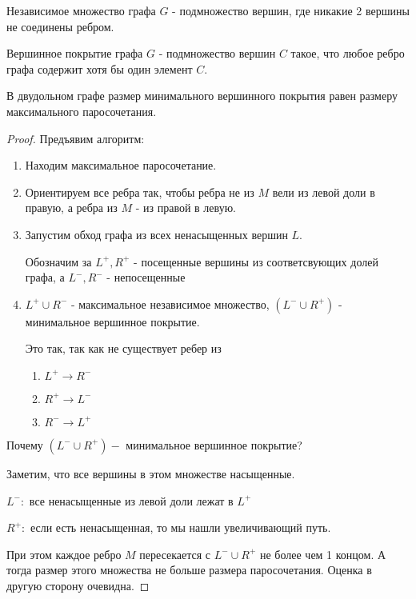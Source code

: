 \begin{definition}
  Независимое множество графа $G$ - подмножество вершин, где никакие 2 вершины не соединены ребром. 
\end{definition}

\begin{definition}
  Вершинное покрытие графа $G$ - подмножество вершин $C$ такое, что любое ребро графа содержит хотя бы один элемент $C$. 
\end{definition}

\begin{theorem}[Кёниг]
  В двудольном графе размер минимального вершинного покрытия равен размеру максимального паросочетания. 
\end{theorem}

\begin{proof}
  Предъявим алгоритм:

  \begin{enumerate}
    \item Находим максимальное паросочетание. 
    \item Ориентируем все ребра так, чтобы ребра не из $M$ вели из левой доли в правую, а ребра из $M$ - из правой в левую.
    \item Запустим обход графа из всех ненасыщенных вершин $L$. 
  
  Обозначим за $L^+, R^+$ - посещенные вершины из соответсвующих долей графа, а $L^-, R^-$ - непосещенные
    \item $L^+ \cup R^-$ - максимальное независимое множество, $(L^- \cup R^+)$ - минимальное вершинное покрытие. 
  
  Это так, так как не существует ребер из 
  \begin{enumerate}
    \item $L^+ \to R^-$
    \item $R^+ \to L^-$
    \item $R^- \to L^+$
  \end{enumerate}
  \end{enumerate}


  \item Почему $(L^- \cup R^+) -$ минимальное вершинное покрытие?
  
  Заметим, что все вершины в этом множестве насыщенные. 
  
  $L^-:$ все ненасыщенные из левой доли лежат в $L^+$

  $R^+:$ если есть ненасыщенная, то мы нашли увеличивающий путь.


  При этом каждое ребро $M$ пересекается с $L^- \cup R^+$ не более чем 1 концом. А тогда размер этого множества не больше размера паросочетания. Оценка в другую сторону очевидна. 
\end{proof}
